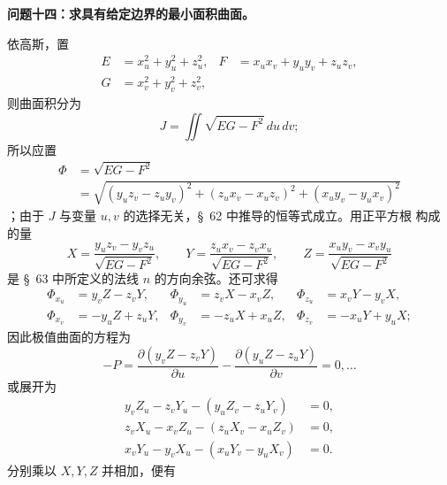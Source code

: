 \documentclass[11pt,a4paper,leqno]{article}
\begin{document}
\begin{center}
\textbf{问题十四：求具有给定边界的最小面积曲面。}
\end{center}

依高斯，置
\[
\begin{aligned}
E&=x_u^2+y_u^2+z_u^2,
&F&=x_ux_v+y_uy_v+z_uz_v,\\
G&=x_v^2+y_v^2+z_v^2,
\end{aligned}
\]
则曲面积分为
\[
J=\iint\sqrt{EG-F^2}\,du\,dv;
\]
所以应置
\[
\begin{aligned}
\Phi&=\sqrt{EG-F^2}\\
&=\sqrt{(y_uz_v-z_uy_v)^2+(z_ux_v-x_uz_v)^2+(x_uy_v-y_ux_v)^2}
\end{aligned}
\]
；由于 $J$ 与变量 $u,v$ 的选择无关，\S~62 中推导的恒等式成立。用正平方根
构成的量
\[
X=\frac{y_uz_v-y_vz_u}{\sqrt{EG-F^2}},\qquad
Y=\frac{z_ux_v-z_vx_u}{\sqrt{EG-F^2}},\qquad
Z=\frac{x_uy_v-x_vy_u}{\sqrt{EG-F^2}}
\]
是 \S~63 中所定义的法线 $n$ 的方向余弦。还可求得
\begin{equation}\tag{10}
\begin{aligned}
\Phi_{x_u}&=y_vZ-z_vY,&
\Phi_{y_u}&=z_vX-x_vZ,&
\Phi_{z_u}&=x_vY-y_vX,\\
\Phi_{x_v}&=-y_uZ+z_uY,&
\Phi_{y_v}&=-z_uX+x_uZ,&
\Phi_{z_v}&=-x_uY+y_uX;
\end{aligned}
\end{equation}
因此极值曲面的方程为
\[
-P=\frac{\partial(y_vZ-z_vY)}{\partial u}
-\frac{\partial(y_uZ-z_uY)}{\partial v}=0,\ldots
\]
或展开为
\[
\begin{aligned}
y_vZ_u-z_vY_u-(y_uZ_v-z_uY_v)&=0,\\
z_vX_u-x_vZ_u-(z_uX_v-x_uZ_v)&=0,\\
x_vY_u-y_vX_u-(x_uY_v-y_uX_v)&=0.
\end{aligned}
\]
分别乘以 $X,Y,Z$ 并相加，便有
\end{document}
